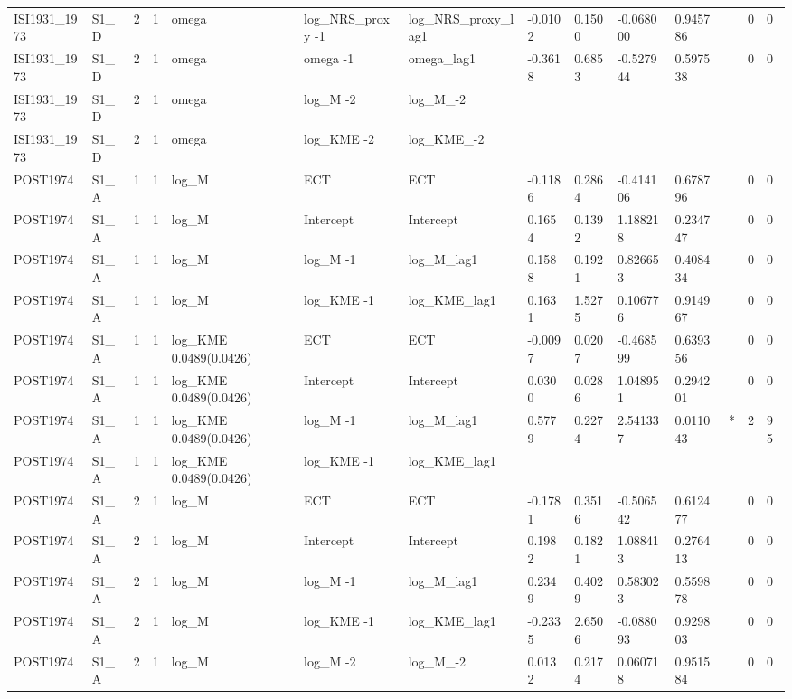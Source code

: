 \begin{tabular}{llllllllllllll}
ISI1931\_1973 & S1\_D & 2 & 1 & omega & log\_NRS\_proxy -1 & log\_NRS\_proxy\_lag1 & -0.0102 & 0.1500 & -0.068000 & 0.945786 &  & 0 & 0 \\
ISI1931\_1973 & S1\_D & 2 & 1 & omega & omega -1 & omega\_lag1 & -0.3618 & 0.6853 & -0.527944 & 0.597538 &  & 0 & 0 \\
ISI1931\_1973 & S1\_D & 2 & 1 & omega & log\_M -2 & log\_M\_-2 &  &  &  &  &  &  &  \\
ISI1931\_1973 & S1\_D & 2 & 1 & omega & log\_KME -2 & log\_KME\_-2 &  &  &  &  &  &  &  \\
POST1974 & S1\_A & 1 & 1 & log\_M & ECT & ECT & -0.1186 & 0.2864 & -0.414106 & 0.678796 &  & 0 & 0 \\
POST1974 & S1\_A & 1 & 1 & log\_M & Intercept & Intercept & 0.1654 & 0.1392 & 1.188218 & 0.234747 &  & 0 & 0 \\
POST1974 & S1\_A & 1 & 1 & log\_M & log\_M -1 & log\_M\_lag1 & 0.1588 & 0.1921 & 0.826653 & 0.408434 &  & 0 & 0 \\
POST1974 & S1\_A & 1 & 1 & log\_M & log\_KME -1 & log\_KME\_lag1 & 0.1631 & 1.5275 & 0.106776 & 0.914967 &  & 0 & 0 \\
POST1974 & S1\_A & 1 & 1 & log\_KME 0.0489(0.0426) & ECT & ECT & -0.0097 & 0.0207 & -0.468599 & 0.639356 &  & 0 & 0 \\
POST1974 & S1\_A & 1 & 1 & log\_KME 0.0489(0.0426) & Intercept & Intercept & 0.0300 & 0.0286 & 1.048951 & 0.294201 &  & 0 & 0 \\
POST1974 & S1\_A & 1 & 1 & log\_KME 0.0489(0.0426) & log\_M -1 & log\_M\_lag1 & 0.5779 & 0.2274 & 2.541337 & 0.011043 & * & 2 & 95 \\
POST1974 & S1\_A & 1 & 1 & log\_KME 0.0489(0.0426) & log\_KME -1 & log\_KME\_lag1 &  &  &  &  &  &  &  \\
POST1974 & S1\_A & 2 & 1 & log\_M & ECT & ECT & -0.1781 & 0.3516 & -0.506542 & 0.612477 &  & 0 & 0 \\
POST1974 & S1\_A & 2 & 1 & log\_M & Intercept & Intercept & 0.1982 & 0.1821 & 1.088413 & 0.276413 &  & 0 & 0 \\
POST1974 & S1\_A & 2 & 1 & log\_M & log\_M -1 & log\_M\_lag1 & 0.2349 & 0.4029 & 0.583023 & 0.559878 &  & 0 & 0 \\
POST1974 & S1\_A & 2 & 1 & log\_M & log\_KME -1 & log\_KME\_lag1 & -0.2335 & 2.6506 & -0.088093 & 0.929803 &  & 0 & 0 \\
POST1974 & S1\_A & 2 & 1 & log\_M & log\_M -2 & log\_M\_-2 & 0.0132 & 0.2174 & 0.060718 & 0.951584 &  & 0 & 0 \\

\end{tabular}
